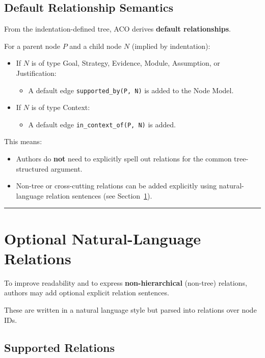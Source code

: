 \documentclass[11pt,twoside,a4paper]{article}
\begin{document}
\subsection{Default Relationship Semantics}

From the indentation-defined tree, ACO derives \textbf{default relationships}.

For a parent node \(P\) and a child node \(N\) (implied by indentation):
\begin{itemize}[leftmargin=2em]
  \item If \(N\) is of type Goal, Strategy, Evidence, Module, Assumption, or Justification:
  \begin{itemize}[leftmargin=1.5em]
    \item A default edge \texttt{supported\_by(P, N)} is added to the Node Model.
  \end{itemize}

  \item If \(N\) is of type Context:
  \begin{itemize}[leftmargin=1.5em]
    \item A default edge \texttt{in\_context\_of(P, N)} is added.
  \end{itemize}
\end{itemize}

This means:
\begin{itemize}[leftmargin=2em]
  \item Authors do \textbf{not} need to explicitly spell out relations for the common tree-structured argument.
  \item Non-tree or cross-cutting relations can be added explicitly using natural-language relation sentences (see Section~\ref{sec:nl-relations}).
\end{itemize}

\bigskip
\hrule
\bigskip

\section{Optional Natural-Language Relations}
\label{sec:nl-relations}

To improve readability and to express \textbf{non-hierarchical} (non-tree) relations, authors may add optional explicit relation sentences.

These are written in a natural language style but parsed into relations over node IDs.

\subsection{Supported Relations}
\end{document}
